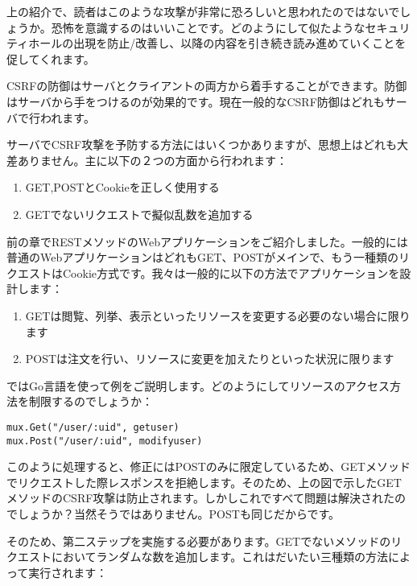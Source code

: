 上の紹介で、読者はこのような攻撃が非常に恐ろしいと思われたのではないでしょうか。恐怖を意識するのはいいことです。どのようにして似たようなセキュリティホールの出現を防止/改善し、以降の内容を引き続き読み進めていくことを促してくれます。

CSRFの防御はサーバとクライアントの両方から着手することができます。防御はサーバから手をつけるのが効果的です。現在一般的なCSRF防御はどれもサーバで行われます。

サーバでCSRF攻撃を予防する方法にはいくつかありますが、思想上はどれも大差ありません。主に以下の２つの方面から行われます：

\begin{enumerate}
  \item GET,POSTとCookieを正しく使用する
  \item GETでないリクエストで擬似乱数を追加する
\end{enumerate}

前の章でRESTメソッドのWebアプリケーションをご紹介しました。一般的には普通のWebアプリケーションはどれもGET、POSTがメインで、もう一種類のリクエストはCookie方式です。我々は一般的に以下の方法でアプリケーションを設計します：

\begin{enumerate}
  \item GETは閲覧、列挙、表示といったリソースを変更する必要のない場合に限ります
  \item POSTは注文を行い、リソースに変更を加えたりといった状況に限ります
\end{enumerate}

ではGo言語を使って例をご説明します。どのようにしてリソースのアクセス方法を制限するのでしょうか：

\begin{lstlisting}[numbers=none]
mux.Get("/user/:uid", getuser)
mux.Post("/user/:uid", modifyuser)
\end{lstlisting}

このように処理すると、修正にはPOSTのみに限定しているため、GETメソッドでリクエストした際レスポンスを拒絶します。そのため、上の図で示したGETメソッドのCSRF攻撃は防止されます。しかしこれですべて問題は解決されたのでしょうか？当然そうではありません。POSTも同じだからです。

そのため、第二ステップを実施する必要があります。GETでないメソッドのリクエストにおいてランダムな数を追加します。これはだいたい三種類の方法によって実行されます：

